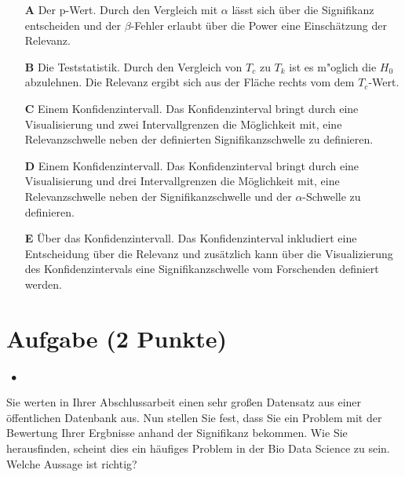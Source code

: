 \documentclass[a4paper, 9pt]{scrartcl}\usepackage[]{graphicx}\usepackage[]{xcolor}
\begin{document}
\begin{enumerate}
\item [\textbf{A} \msquare] Der p-Wert. Durch den Vergleich mit $\alpha$ lässt sich über die Signifikanz entscheiden und der $\beta$-Fehler erlaubt über die Power eine Einschätzung der Relevanz.
\item [\textbf{B} \msquare] Die Teststatistik. Durch den Vergleich von $T_c$ zu $T_k$ ist es m{"o}glich die $H_0$ abzulehnen. Die Relevanz ergibt sich aus der Fläche rechts vom dem $T_c$-Wert.
\item [\textbf{C} \msquare] Einem Konfidenzintervall. Das Konfidenzinterval bringt durch eine Visualisierung und zwei Intervallgrenzen die Möglichkeit mit, eine Relevanzschwelle neben der definierten Signifikanzschwelle zu definieren.
\item [\textbf{D} \msquare] Einem Konfidenzintervall. Das Konfidenzinterval bringt durch eine Visualisierung und drei Intervallgrenzen die Möglichkeit mit, eine Relevanzschwelle neben der Signifikanzschwelle und der $\alpha$-Schwelle zu definieren.
\item [\textbf{E} \msquare] Über das Konfidenzintervall. Das Konfidenzinterval inkludiert eine Entscheidung über die Relevanz und zusätzlich kann über die Visualizierung des Konfidenzintervals eine Signifikanzschwelle vom Forschenden definiert werden.
\end{enumerate}

\section{Aufgabe \hfill (2 Punkte)}

\ifcollection
\begin{flushright}
\tiny\vspace{-2Ex}
\textbf{\examinhaltstart}
\exammodulestatversuch $\;\bullet$
\exammodulebiostat
\vspace{-1Ex}
\end{flushright}
\fi




Sie werten in Ihrer Abschlussarbeit einen sehr großen Datensatz aus einer öffentlichen Datenbank aus. Nun stellen Sie fest, dass Sie ein Problem mit der Bewertung Ihrer Ergbnisse anhand der Signifikanz bekommen. Wie Sie herausfinden, scheint dies ein häufiges Problem in der Bio Data Science zu sein. Welche Aussage ist richtig?
\end{document}
